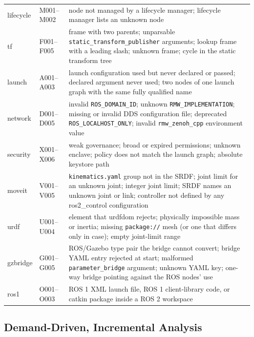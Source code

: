 \documentclass[conference]{IEEEtran}
\newcommand{\code}[1]{\texttt{#1}}
\begin{document}
\begin{table}[t]
\begin{tabularx}{\textwidth}{@{}l l X@{}}
lifecycle & M001--M002 & node not managed by a lifecycle manager; lifecycle manager lists an unknown node\\
tf        & F001--F005 & frame with two parents; unparsable \code{static\_transform\_publisher} arguments; lookup frame with a leading slash; unknown frame; cycle in the static transform tree\\
launch    & A001--A003 & launch configuration used but never declared or passed; declared argument never used; two nodes of one launch graph with the same fully qualified name\\
network   & D001--D005 & invalid \code{ROS\_DOMAIN\_ID}; unknown \code{RMW\_IMPLEMENTATION}; missing or invalid DDS configuration file; deprecated \code{ROS\_LOCALHOST\_ONLY}; invalid \code{rmw\_zenoh\_cpp} environment value\\
security  & X001--X006 & weak governance; broad or expired permissions; unknown enclave; policy does not match the launch graph; absolute keystore path\\
moveit    & V001--V005 & \code{kinematics.yaml} group not in the SRDF; joint limit for an unknown joint; integer joint limit; SRDF names an unknown joint or link; controller not defined by any ros2\_control configuration\\
urdf      & U001--U004 & element that urdfdom rejects; physically impossible mass or inertia; missing \code{package://} mesh (or one that differs only in case); empty joint-limit range\\
gzbridge  & G001--G005 & ROS/Gazebo type pair the bridge cannot convert; bridge YAML entry rejected at start; malformed \code{parameter\_bridge} argument; unknown YAML key; one-way bridge pointing against the ROS nodes' use\\
ros1      & O001--O003 & ROS 1 XML launch file, ROS 1 client-library code, or catkin package inside a ROS 2 workspace\\
\bottomrule
\end{tabularx}
\end{table}

\subsection{Demand-Driven, Incremental Analysis}
\label{sec:incremental}
\end{document}
